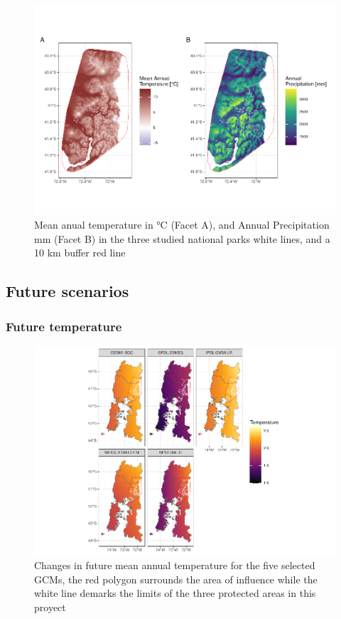 \documentclass[]{article}
\begin{document}
\begin{figure}
\includegraphics[width=1\linewidth,height=1\textheight]{Review_and_climate_files/figure-latex/PresenteClimaBuffer-1} \caption{Mean anual temperature in °C (Facet A), and Annual Precipitation mm (Facet B) in the three studied national parks white lines, and a 10 km buffer red line}\label{fig:PresenteClimaBuffer}
\end{figure}

\hypertarget{future-scenarios}{%
\subsection{Future scenarios}\label{future-scenarios}}

\hypertarget{future-temperature}{%
\subsubsection{Future temperature}\label{future-temperature}}

\begin{figure}
\centering
\includegraphics{Review_and_climate_files/figure-latex/DifTemp-1.pdf}
\caption{\label{fig:DifTemp}Changes in future mean annual temperature for the five selected GCMs, the red polygon surrounds the area of influence while the white line demarks the limits of the three protected areas in this proyect}
\end{figure}
\end{document}
